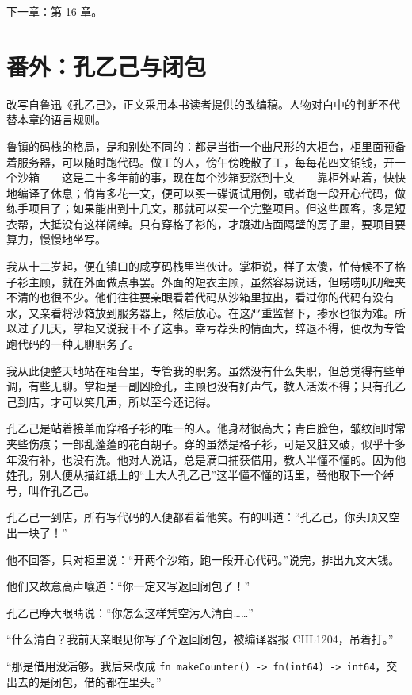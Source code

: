下一章：\hyperref[ch:16]{第 16 章}。

\section{番外：孔乙己与闭包}

改写自鲁迅《孔乙己》，正文采用本书读者提供的改编稿。人物对白中的判断不代替本章的语言规则。

鲁镇的码栈的格局，是和别处不同的：都是当街一个曲尺形的大柜台，柜里面预备着服务器，可以随时跑代码。做工的人，傍午傍晚散了工，每每花四文铜钱，开一个沙箱——这是二十多年前的事，现在每个沙箱要涨到十文——靠柜外站着，快快地编译了休息；倘肯多花一文，便可以买一碟调试用例，或者跑一段开心代码，做练手项目了；如果能出到十几文，那就可以买一个完整项目。但这些顾客，多是短衣帮，大抵没有这样阔绰。只有穿格子衫的，才踱进店面隔壁的房子里，要项目要算力，慢慢地坐写。

我从十二岁起，便在镇口的咸亨码栈里当伙计。掌柜说，样子太傻，怕侍候不了格子衫主顾，就在外面做点事罢。外面的短衣主顾，虽然容易说话，但唠唠叨叨缠夹不清的也很不少。他们往往要亲眼看着代码从沙箱里拉出，看过你的代码有没有水，又亲看将沙箱放到服务器上，然后放心。在这严重监督下，掺水也很为难。所以过了几天，掌柜又说我干不了这事。幸亏荐头的情面大，辞退不得，便改为专管跑代码的一种无聊职务了。

我从此便整天地站在柜台里，专管我的职务。虽然没有什么失职，但总觉得有些单调，有些无聊。掌柜是一副凶脸孔，主顾也没有好声气，教人活泼不得；只有孔乙己到店，才可以笑几声，所以至今还记得。

孔乙己是站着接单而穿格子衫的唯一的人。他身材很高大；青白脸色，皱纹间时常夹些伤痕；一部乱蓬蓬的花白胡子。穿的虽然是格子衫，可是又脏又破，似乎十多年没有补，也没有洗。他对人说话，总是满口捕获借用，教人半懂不懂的。因为他姓孔，别人便从描红纸上的“上大人孔乙己”这半懂不懂的话里，替他取下一个绰号，叫作孔乙己。

孔乙己一到店，所有写代码的人便都看着他笑。有的叫道：“孔乙己，你头顶又空出一块了！”

他不回答，只对柜里说：“开两个沙箱，跑一段开心代码。”说完，排出九文大钱。

他们又故意高声嚷道：“你一定又写返回闭包了！”

孔乙己睁大眼睛说：“你怎么这样凭空污人清白……”

“什么清白？我前天亲眼见你写了个返回闭包，被编译器报 CHL1204，吊着打。”

“那是借用没活够。我后来改成 \texttt{fn make\allowbreak{}Counter(\allowbreak{})\allowbreak{} -\allowbreak{}>\allowbreak{} fn(\allowbreak{}int64)\allowbreak{} -\allowbreak{}>\allowbreak{} int64}，交出去的是闭包，借的都在里头。”

